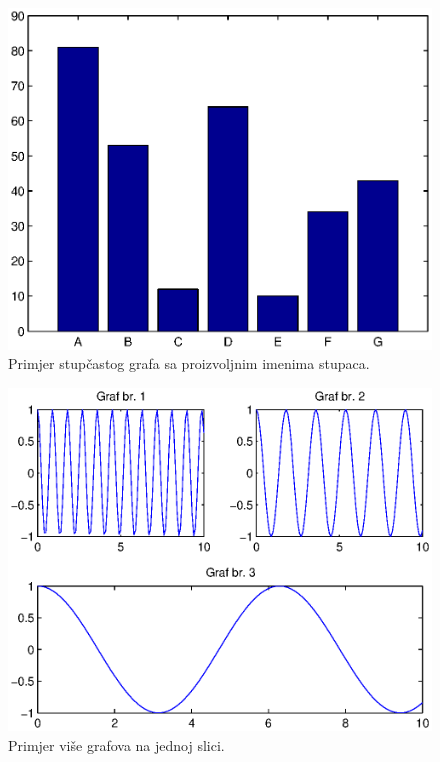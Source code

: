 \documentclass[a4paper, 10pt]{article}
\begin{document}
\begin{figure}[!htb]
\centering
\includegraphics[width=0.95\linewidth]{slike/bar_imenovan.eps}
\caption{Primjer stupčastog grafa sa proizvoljnim imenima stupaca.}
\label{fig:bar_imenovan}
\end{figure}

\clearpage %

\begin{figure}[H]
\centering
\includegraphics[width=0.95\linewidth]{slike/subplot.eps}
\caption{Primjer više grafova na jednoj slici.}
\label{fig:subplot}
\end{figure}

\end{document}
